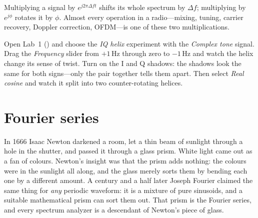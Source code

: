 
\begin{keyidea}
Multiplying a signal by $e^{j2\pi\Delta f t}$ shifts its whole spectrum by $\Delta f$; multiplying by
$e^{j\phi}$ rotates it by $\phi$. Almost every operation in a radio---mixing, tuning, carrier
recovery, Doppler correction, OFDM---is one of these two multiplications.
\end{keyidea}

\begin{tryit}
Open Lab~1 () and choose the \emph{IQ helix} experiment with the
\emph{Complex tone} signal. Drag the \emph{Frequency} slider from $+1$\,Hz through zero to
$-1$\,Hz and watch the helix change its sense of twist. Turn on the I and Q shadows: the shadows
look the same for both signs---only the pair together tells them apart. Then select
\emph{Real cosine} and watch it split into two counter-rotating helices.
\end{tryit}

\section{Fourier series}
\label{sec:ch02:fs}

In 1666 Isaac Newton darkened a room, let a thin beam of sunlight through a hole in the shutter, and
passed it through a glass prism. White light came out as a fan of colours. Newton's insight was that
the prism adds nothing: the colours were in the sunlight all along, and the glass merely sorts them
by bending each one by a different amount. A century and a half later Joseph Fourier claimed the
same thing for \emph{any} periodic waveform: it is a mixture of pure sinusoids, and a suitable
mathematical prism can sort them out. That prism is the Fourier series, and every spectrum analyzer
is a descendant of Newton's piece of glass.


